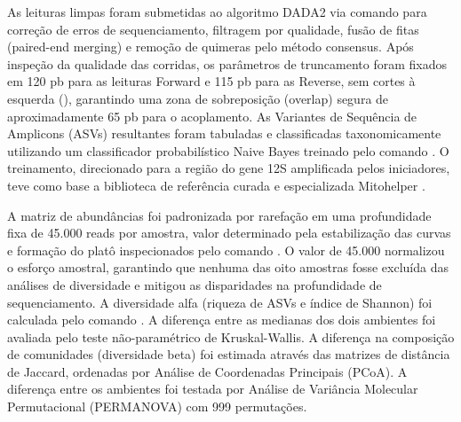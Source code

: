 As leituras limpas foram submetidas ao algoritmo DADA2 via comando  para correção de erros de sequenciamento, filtragem por qualidade, fusão de fitas (paired-end merging) e remoção de quimeras pelo método consensus. Após inspeção da qualidade das corridas, os parâmetros de truncamento foram fixados em 120 pb para as leituras Forward e 115 pb para as Reverse, sem cortes à esquerda (), garantindo uma zona de sobreposição (overlap) segura de aproximadamente 65 pb para o acoplamento. As Variantes de Sequência de Amplicons (ASVs) resultantes foram tabuladas e classificadas taxonomicamente utilizando um classificador probabilístico Naive Bayes treinado pelo comando . O treinamento, direcionado para a região do gene 12S amplificada pelos iniciadores, teve como base a biblioteca de referência curada e especializada Mitohelper \cite{Lim.Thompson2021}.

A matriz de abundâncias foi padronizada por rarefação em uma profundidade fixa de 45.000 reads por amostra, valor determinado pela estabilização das curvas e formação do platô inspecionados pelo comando . O valor de 45.000 normalizou o esforço amostral, garantindo que nenhuma das oito amostras fosse excluída das análises de diversidade e mitigou as disparidades na profundidade de sequenciamento. A diversidade alfa (riqueza de ASVs e índice de Shannon) foi calculada pelo comando . A diferença entre as medianas dos dois ambientes foi avaliada pelo teste não-paramétrico de Kruskal-Wallis. A diferença na composição de comunidades (diversidade beta) foi estimada através das matrizes de distância de Jaccard, ordenadas por Análise de Coordenadas Principais (PCoA). A diferença entre os ambientes foi testada por Análise de Variância Molecular Permutacional (PERMANOVA) com 999 permutações.
